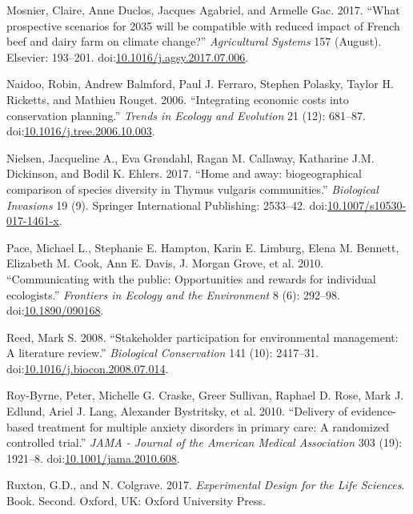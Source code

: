 \documentclass[fleqn,10pt]{wlpeerj} %
\begin{document}
\hypertarget{ref-Mosnier2017}{}
Mosnier, Claire, Anne Duclos, Jacques Agabriel, and Armelle Gac. 2017.
``What prospective scenarios for 2035 will be compatible with reduced
impact of French beef and dairy farm on climate change?''
\emph{Agricultural Systems} 157 (August). Elsevier: 193--201.
doi:\href{https://doi.org/10.1016/j.agsy.2017.07.006}{10.1016/j.agsy.2017.07.006}.

\hypertarget{ref-Naidoo2006}{}
Naidoo, Robin, Andrew Balmford, Paul J. Ferraro, Stephen Polasky, Taylor
H. Ricketts, and Mathieu Rouget. 2006. ``Integrating economic costs into
conservation planning.'' \emph{Trends in Ecology and Evolution} 21 (12):
681--87.
doi:\href{https://doi.org/10.1016/j.tree.2006.10.003}{10.1016/j.tree.2006.10.003}.

\hypertarget{ref-Nielsen2017}{}
Nielsen, Jacqueline A., Eva Grøndahl, Ragan M. Callaway, Katharine J.M.
Dickinson, and Bodil K. Ehlers. 2017. ``Home and away: biogeographical
comparison of species diversity in Thymus vulgaris communities.''
\emph{Biological Invasions} 19 (9). Springer International Publishing:
2533--42.
doi:\href{https://doi.org/10.1007/s10530-017-1461-x}{10.1007/s10530-017-1461-x}.

\hypertarget{ref-Pace2010}{}
Pace, Michael L., Stephanie E. Hampton, Karin E. Limburg, Elena M.
Bennett, Elizabeth M. Cook, Ann E. Davis, J. Morgan Grove, et al. 2010.
``Communicating with the public: Opportunities and rewards for
individual ecologists.'' \emph{Frontiers in Ecology and the Environment}
8 (6): 292--98.
doi:\href{https://doi.org/10.1890/090168}{10.1890/090168}.

\hypertarget{ref-Reed2008}{}
Reed, Mark S. 2008. ``Stakeholder participation for environmental
management: A literature review.'' \emph{Biological Conservation} 141
(10): 2417--31.
doi:\href{https://doi.org/10.1016/j.biocon.2008.07.014}{10.1016/j.biocon.2008.07.014}.

\hypertarget{ref-Roy-Byrne2010}{}
Roy-Byrne, Peter, Michelle G. Craske, Greer Sullivan, Raphael D. Rose,
Mark J. Edlund, Ariel J. Lang, Alexander Bystritsky, et al. 2010.
``Delivery of evidence-based treatment for multiple anxiety disorders in
primary care: A randomized controlled trial.'' \emph{JAMA - Journal of
the American Medical Association} 303 (19): 1921--8.
doi:\href{https://doi.org/10.1001/jama.2010.608}{10.1001/jama.2010.608}.

\hypertarget{ref-Ruxton2017}{}
Ruxton, G.D., and N. Colgrave. 2017. \emph{Experimental Design for the
Life Sciences}. Book. Second. Oxford, UK: Oxford University Press.
\end{document}

